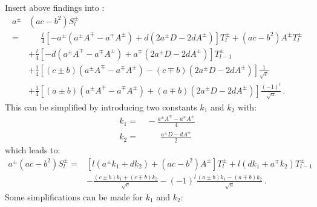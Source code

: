 Insert above findings into :
\begin{align}
  a^{\pm} & \left(ac-b^2\right) S^{\pm}_l \nonumber \\
  =& \phantom{+}~ \frac{l}{4} \left[
                    - a^{\pm} \left(   a^{\pm} A^{\mp} -   a^{\mp} A^{\pm} \right)
                    + d       \left( 2 a^{\pm} D       - 2 d       A^{\pm} \right)
                  \right] T^{\pm}_l
              +   \left(ac-b^2\right)  A^{\pm} T^{\pm}_l \nonumber \\
  ~&          +   \frac{l}{4} \left[
                    - d       \left(   a^{\pm} A^{\mp} -   a^{\mp} A^{\pm} \right)
                    + a^{\mp} \left( 2 a^{\pm} D       - 2 d       A^{\pm} \right)
                  \right] T^{\pm}_{l-1} \nonumber \\
  ~&          +   \frac{1}{4} \left[
                      (c \pm b) \left(   a^{\pm} A^{\mp} -   a^{\mp} A^{\pm} \right)
                    - (c \mp b) \left( 2 a^{\pm} D       - 2 d       A^{\pm} \right)
                  \right] \frac{1}{\sqrt{c}} \nonumber \\
  ~&          +   \frac{1}{4} \left[
                      (a \pm b) \left(   a^{\pm} A^{\mp} -   a^{\mp} A^{\pm} \right)
                    + (a \mp b) \left( 2 a^{\pm} D       - 2 d       A^{\pm} \right)
                  \right] \frac{(-1)^l}{\sqrt{a}} \, . \label{eqn:S_pm_l_final}
\end{align}
This can be simplified by introducing two constants $k_1$ and $k_2$ with:
\begin{align}
  k_1 =&\,          -       \frac{ a^{\pm} A^{\mp} - a^{\mp} A^{\pm} }{4} \label{eqn:k1_original} \\
  k_2 =&\, \phantom{-}~\,   \frac{ a^{\pm} D       - d       A^{\pm} }{2} \label{eqn:k2_original}
\end{align}
which leads to:
\begin{align}
  a^{\pm} \left(ac-b^2\right) S^{\pm}_l
  =& \left[ l \left( a^{\pm}   k_1 +     d     k_2 \right)
                +                        \left(ac-b^2\right)  A^{\pm} \right] T^{\pm}_l
                +   l \left(     d     k_1 +  a^{\mp}  k_2 \right) T^{\pm}_{l-1} \nonumber \\
  ~&          -        \frac{ (c \pm b) k_1 + (c \mp b) k_2 }{\sqrt{c}}
              - (-1)^l \frac{ (a \pm b) k_1 - (a \mp b) k_2 }{\sqrt{a}} \, . \label{eqn:S_pm_l_Merkel}
\end{align}
Some simplifications can be made for $k_1$ and $k_2$:
